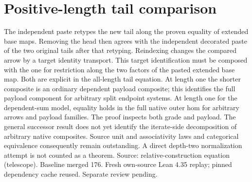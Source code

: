 \documentclass{article}
\begin{document}
\section*{Positive-length tail comparison}
The independent paste retypes the new tail along the proven equality of extended base maps. Removing the head then agrees with the independent decorated paste of the two original tails after that retyping. Reindexing changes the compared arrow by a target identity transport. This target identification must be composed with the one for restriction along the two factors of the pasted extended base map. Both are explicit in the all-length tail equation. At length one the shorter composite is an ordinary dependent payload composite; this identifies the full payload component for arbitrary split endpoint systems. At length one for the dependent-sum model, equality holds in the full native outer hom for arbitrary arrows and payload families. The proof inspects both grade and payload. The general successor result does not yet identify the iterate-side decomposition of arbitrary native composites. Source unit and associativity laws and categorical equivalence consequently remain outstanding. A direct depth-two normalization attempt is not counted as a theorem. Source: relative-construction equation (telescope). Baseline merged 176. Fresh own-source Lean 4.35 replay; pinned dependency cache reused. Separate review pending.
\end{document}
